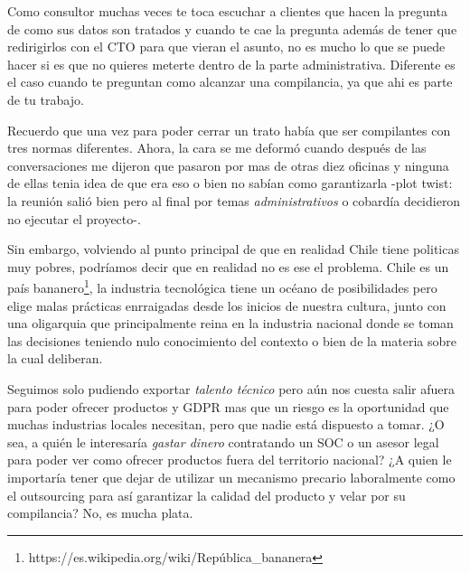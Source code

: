 \documentclass[11pt]{utalcaDoc}
\begin{document}
Como consultor muchas veces te toca escuchar a clientes que hacen la pregunta de como  sus datos son tratados y cuando te cae la pregunta además de tener que redirigirlos con el CTO para que vieran el asunto, no es mucho lo que se puede hacer si es que no quieres meterte dentro de la parte administrativa. Diferente es el caso cuando te preguntan como alcanzar una compilancia, ya que ahi es parte de tu trabajo.

Recuerdo que una vez para poder cerrar un trato había que ser compilantes con tres normas diferentes. Ahora, la cara se me deformó cuando después de las conversaciones me dijeron que pasaron por mas de otras diez oficinas y ninguna de ellas tenia idea de que era eso o bien no sabían como garantizarla -plot twist: la reunión salió bien pero al final por temas \textit{administrativos} o cobardía decidieron no ejecutar el proyecto-.

Sin embargo, volviendo al punto principal de que en realidad Chile tiene politicas muy pobres, podríamos decir que en realidad no es ese el problema. Chile es un país bananero\footnote{https://es.wikipedia.org/wiki/República_bananera}, la industria tecnológica tiene un océano de posibilidades pero elige malas prácticas enrraigadas desde los inicios de nuestra cultura, junto con una oligarquia que principalmente reina en la industria nacional donde se toman las decisiones teniendo nulo conocimiento del contexto o bien de la materia sobre la cual deliberan.

Seguimos solo pudiendo exportar \textit{talento técnico} pero aún nos cuesta salir afuera para poder ofrecer productos y GDPR mas que un riesgo es la oportunidad que muchas industrias locales necesitan, pero que nadie está dispuesto a tomar. ¿O sea, a quién le interesaría \textit{gastar dinero} contratando un SOC o un asesor legal para poder ver como ofrecer productos fuera del territorio nacional? ¿A quien le importaría tener que dejar de utilizar un mecanismo precario laboralmente como el outsourcing para así garantizar la calidad del producto y velar por su compilancia? No, es mucha plata.
\end{document}
